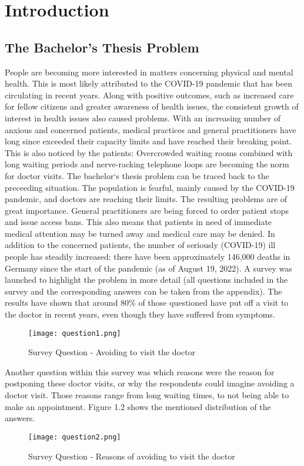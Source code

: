

\chapter{Introduction}


\section{The Bachelor's Thesis Problem}
People are becoming more interested in matters concerning physical and mental health. This is most likely attributed to the COVID-19 pandemic that has been circulating in recent years. Along with positive outcomes, such as increased care for fellow citizens and greater awareness of health issues, the consistent growth of interest in health issues also caused problems. With an increasing number of anxious and concerned patients, medical practices and general practitioners have long since exceeded their capacity limits and have reached their breaking point. This is also noticed by the patients: Overcrowded waiting rooms combined with long waiting periods and nerve-racking telephone loops are becoming the norm for doctor visits. The bachelor`s thesis problem can be traced back to the preceeding situation. The population is fearful, mainly caused by the COVID-19 pandemic, and doctors are reaching their limits. The resulting problems are of great importance. General practitioners are being forced to order patient stops and issue access bans. This also means that patients in need of immediate medical attention may be turned away and medical care may be denied. In addition to the concerned patients, the number of seriously (COVID-19) ill people has steadily increased: there have been approximately 146,000 deaths in Germany since the start of the pandemic (as of August 19, 2022). A survey was launched to highlight the problem in more detail (all questions included in the survey and the corresponding answers can be taken from the appendix). The results have shown that around 80\% of those questioned have put off a visit to the doctor in recent years, even though they have suffered from symptoms.
\begin{figure}[h]
	\centering
	\texttt{[image: question1.png]}
	\caption[Survey Question]{Survey Question - Avoiding to visit the doctor}
\end{figure}

Another question within this survey was which reasons were the reason for postponing these doctor visits, or why the respondents could imagine avoiding a doctor visit. Those reasons range from long waiting times, to not being able to make an appointment. Figure 1.2 shows the mentioned distribution of the answers.
\begin{figure}[h]
	\centering
	\texttt{[image: question2.png]}
	\caption[Survey Question]{Survey Question - Reasons of avoiding to visit the doctor}
\end{figure}

